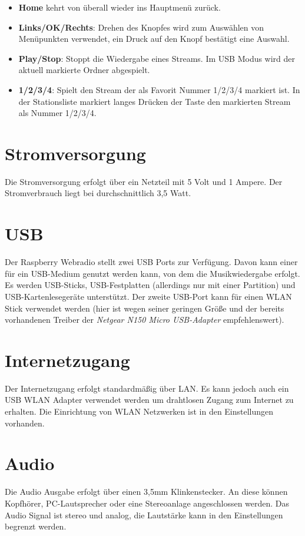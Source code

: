 \documentclass[12pt,a4paper,openany]{memoir}
\begin{document}
\begin{itemize}
 \item \textbf{Home} kehrt von überall wieder ins Hauptmenü zurück.
 \item \textbf{Links/OK/Rechts}: Drehen des Knopfes wird zum Auswählen von Menüpunkten verwendet, ein Druck auf den Knopf bestätigt eine Auswahl.
 \item \textbf{Play/Stop}: Stoppt die Wiedergabe eines Streams. Im USB Modus wird der aktuell markierte Ordner abgespielt.
 \item \textbf{1/2/3/4}: Spielt den Stream der als Favorit Nummer 1/2/3/4 markiert ist. In der Stationsliste markiert langes Drücken der Taste den markierten Stream als Nummer 1/2/3/4.
\end{itemize}

\section{Stromversorgung}
Die Stromversorgung erfolgt über ein Netzteil mit 5 Volt und 1 Ampere. Der Stromverbrauch liegt bei durchschnittlich 3,5 Watt. 

\section{USB}
Der Raspberry Webradio stellt zwei USB Ports zur Verfügung. Davon kann einer für ein USB-Medium genutzt werden kann, von dem die Musikwiedergabe erfolgt. Es werden USB-Sticks, 
USB-Festplatten (allerdings nur mit einer Partition) und USB-Kartenlesegeräte unterstützt. 
Der zweite USB-Port kann für einen WLAN Stick verwendet werden (hier ist wegen seiner geringen Größe und der bereits vorhandenen Treiber der \textit{Netgear N150 Micro USB-Adapter} empfehlenswert).

\section{Internetzugang}
Der Internetzugang erfolgt standardmäßig über LAN. Es kann jedoch auch ein USB WLAN Adapter verwendet werden um drahtlosen Zugang zum Internet zu erhalten. Die Einrichtung von WLAN Netzwerken 
ist in den Einstellungen vorhanden. 

\section{Audio}
Die Audio Ausgabe erfolgt über einen 3,5mm Klinkenstecker. An diese können Kopfhörer, PC-Lautsprecher oder eine Stereoanlage angeschlossen werden. 
Das Audio Signal ist stereo und analog, die Lautstärke kann in den Einstellungen begrenzt werden. 
\end{document}
